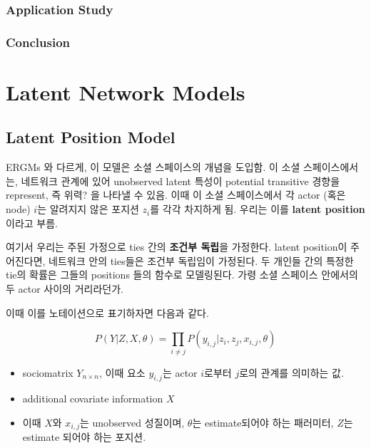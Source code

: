 \documentclass[
]{book}
\providecommand{\tightlist}{%
  \setlength{\itemsep}{0pt}\setlength{\parskip}{0pt}}
\begin{document}
{{{\hypertarget{application-study}{%
\subsubsection{Application Study}\label{application-study}}

\hypertarget{conclusion}{%
\subsubsection{Conclusion}\label{conclusion}}

\hypertarget{latent-network-models}{%
\section{Latent Network Models}\label{latent-network-models}}

\hypertarget{latent-position-model}{%
\subsection{Latent Position Model}\label{latent-position-model}}

ERGMs 와 다르게, 이 모델은 소셜 스페이스의 개념을 도입함. 이 소셜 스페이스에서는, 네트워크 관계에 있어 unobserved latent 특성이 potential transitive 경향을 represent, 즉 위력? 을 나타낼 수 있음. 이때 이 소셜 스페이스에서 각 actor (혹은 node) \(i\)는 알려지지 않은 포지션 \(z_i\)를 각각 차지하게 됨. 우리는 이를 \textbf{latent position} 이라고 부름.

여기서 우리는 주된 가정으로 ties 간의 \textbf{조건부 독립}을 가정한다. latent position이 주어진다면, 네트워크 안의 ties들은 조건부 독립임이 가정된다. 두 개인들 간의 특정한 tie의 확률은 그들의 positions 들의 함수로 모델링된다. 가령 소셜 스페이스 안에서의 두 actor 사이의 거리라던가.

이때 이를 노테이션으로 표기하자면 다음과 같다.

\[
P(Y | Z, X, \theta) = \prod_{i \not = j} P(y_{i,j} | z_i , z_j , x_{i,j}, \theta)
\]

\begin{itemize}
\tightlist
\item
  sociomatrix \(Y_{n \times n}\), 이때 요소 \(y_{i,j}\)는 actor \(i\)로부터 \(j\)로의 관계를 의미하는 값.
\item
  additional covariate information \(X\)
\item
  이때 \(X\)와 \(x_{i,j}\)는 unobserved 성질이며, \(\theta\)는 estimate되어야 하는 패러미터, \(Z\)는 estimate 되어야 하는 포지션.
\end{itemize}

}}}
\end{document}

